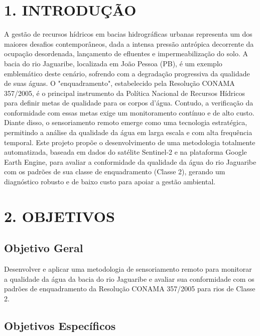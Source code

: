 \documentclass[12pt, a4paper]{article}
\begin{document}
    \section*{1. INTRODUÇÃO}
    A gestão de recursos hídricos em bacias hidrográficas urbanas representa um dos maiores desafios contemporâneos, dada a intensa pressão antrópica decorrente da ocupação desordenada, lançamento de efluentes e impermeabilização do solo. A bacia do rio Jaguaribe, localizada em João Pessoa (PB), é um exemplo emblemático deste cenário, sofrendo com a degradação progressiva da qualidade de suas águas. O "enquadramento", estabelecido pela Resolução CONAMA 357/2005, é o principal instrumento da Política Nacional de Recursos Hídricos para definir metas de qualidade para os corpos d'água. Contudo, a verificação da conformidade com essas metas exige um monitoramento contínuo e de alto custo. Diante disso, o sensoriamento remoto emerge como uma tecnologia estratégica, permitindo a análise da qualidade da água em larga escala e com alta frequência temporal. Este projeto propõe o desenvolvimento de uma metodologia totalmente automatizada, baseada em dados do satélite Sentinel-2 e na plataforma Google Earth Engine, para avaliar a conformidade da qualidade da água do rio Jaguaribe com os padrões de sua classe de enquadramento (Classe 2), gerando um diagnóstico robusto e de baixo custo para apoiar a gestão ambiental.

    \section*{2. OBJETIVOS}
    \subsection*{Objetivo Geral}
    Desenvolver e aplicar uma metodologia de sensoriamento remoto para monitorar a qualidade da água da bacia do rio Jaguaribe e avaliar sua conformidade com os padrões de enquadramento da Resolução CONAMA 357/2005 para rios de Classe 2.

    \subsection*{Objetivos Específicos}
   
\end{document}

